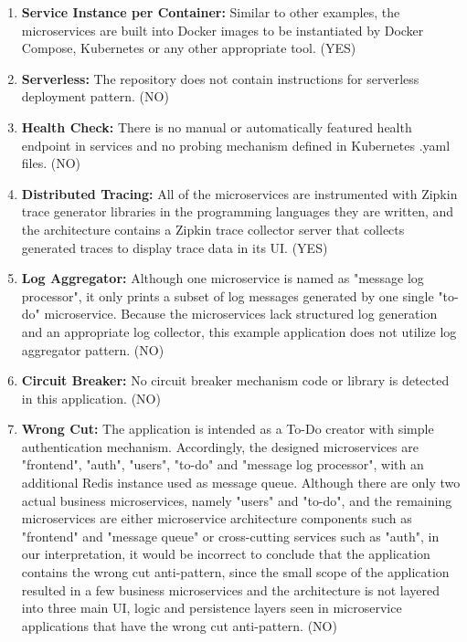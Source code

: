 \documentclass{Configuration_Files/PoliMi3i_thesis}
\begin{document}
\begin{enumerate}
    \item \textbf{Service Instance per Container:} Similar to other examples, the microservices are built into Docker images to be instantiated by Docker Compose, Kubernetes or any other appropriate tool. (YES)
    
    \item \textbf{Serverless:} The repository does not contain instructions for serverless deployment pattern. (NO)
    
    \item \textbf{Health Check:} There is no manual or automatically featured health endpoint in services and no probing mechanism defined in Kubernetes .yaml files. (NO)
    
    \item \textbf{Distributed Tracing:} All of the microservices are instrumented with Zipkin trace generator libraries in the programming languages they are written, and the architecture contains a Zipkin trace collector server that collects generated traces to display trace data in its UI. (YES)
    
    \item \textbf{Log Aggregator:} Although one microservice is named as "message log processor", it only prints a subset of log messages generated by one single "to-do" microservice.
    Because the microservices lack structured log generation and an appropriate log collector, this example application does not utilize log aggregator pattern. (NO)
    
    \item \textbf{Circuit Breaker:} No circuit breaker mechanism code or library is detected in this application. (NO)
    
    \item \textbf{Wrong Cut:} The application is intended as a To-Do creator with simple authentication mechanism.
    Accordingly, the designed microservices are "frontend", "auth", "users", "to-do" and "message log processor", with an additional Redis instance used as message queue.
    Although there are only two actual business microservices, namely "users" and "to-do", and the remaining microservices are either microservice architecture components such as "frontend" and "message queue" or cross-cutting services such as "auth", in our interpretation, it would be incorrect to conclude that the application contains the wrong cut anti-pattern, since the small scope of the application resulted in a few business microservices and the architecture is not layered into three main UI, logic and persistence layers seen in microservice applications that have the wrong cut anti-pattern. (NO)
    

\end{enumerate}
\end{document}
